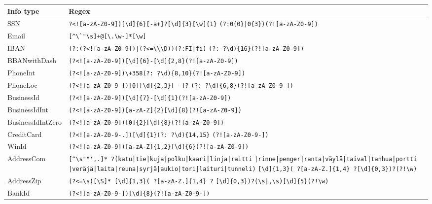 \begin{table}[]
    \begin{tabularx}{\textwidth}{|L{0.18\textwidth}|Y|}
        \hline
        \textbf{Info type} &
        \textbf{Regex} \\ \hline
        SSN &
        \verb=?<![a-zA-Z0-9])[\d]{6}[-a+]?[\d]{3}[\w]{1}=
        \verb=(?:0{0}|0{3})(?![a-zA-Z0-9])=
        \\ \hline
        Email &
        \verb=[^\`"\s]+@[\.\w-]*[\w]=
        \\ \hline
        IBAN &
        \verb&(?:(?<![a-zA-Z0-9])|(?<=\\\D))(?:FI|fi)&
        \verb&(?: ?\d){16}(?![a-zA-Z0-9])&
        \\ \hline
        BBANwithDash &
        \verb=(?<![a-zA-Z0-9])[\d]{6}-[\d]{2,8}(?![a-zA-Z0-9])=
        \\ \hline
        PhoneInt &
        \verb=(?<![a-zA-Z0-9])\+358(?: ?\d){8,10}(?![a-zA-Z0-9])=
        \\ \hline
        PhoneLoc &
        \verb=(?<![a-zA-Z0-9-])[0][\d]{2,3}[ -]?=
        \verb=(?: ?\d){6,8}(?![a-zA-Z0-9-])=
        \\ \hline
        BusinessId &
        \verb=(?<![a-zA-Z0-9])[\d]{7}-[\d]{1}(?![a-zA-Z0-9])=
        \\ \hline
        BusinessIdInt &
        \verb=(?<![a-zA-Z0-9])[a-zA-Z]{2}[\d]{8}(?![a-zA-Z0-9])=
        \\ \hline
        BusinessIdIntZero &
        \verb=(?<![a-zA-Z0-9])[0]{2}[\d]{8}(?![a-zA-Z0-9])=
        \\ \hline
        CreditCard &
        \verb=(?<![a-zA-Z0-9-.])[\d]{1}(?: ?\d){14,15}=
        \verb=(?![a-zA-Z0-9-])=
        \\ \hline
        WinId &
        \verb=(?<![a-zA-Z0-9])[a-zA-Z]{1,2}[\d]{6}(?![a-zA-Z0-9])=
        \\ \hline
        AddressCom &
        \verb=[^\s""',.]* ?=\texttt{(katu|tie|kuja|polku|kaari|linja|raitti}
        \texttt{|rinne|penger|ranta|väylä|taival|tanhua|portti}
        \texttt{|veräjä|laita|reuna|syrjä|aukio|tori|laituri|tunneli)}
        \verb=[\d]{1,3}( ?[a-zA-Z.]{1,4} ?[\d]{0,3})?(?!\w)=
        \\ \hline
        AddressZip &
        \verb&(?<=\s)[\S]* [\d]{1,3}( ?[a-zA-Z.]{1,4} ?&
        \verb&[\d]{0,3})?(\s|,\s)[\d]{5}(?!\w)&
        \\ \hline
        BankId &
        \verb=(?<![a-zA-Z0-9-])[\d]{8}(?![a-zA-Z0-9-])=
        \\ \hline

\end{tabularx}
\end{table}
